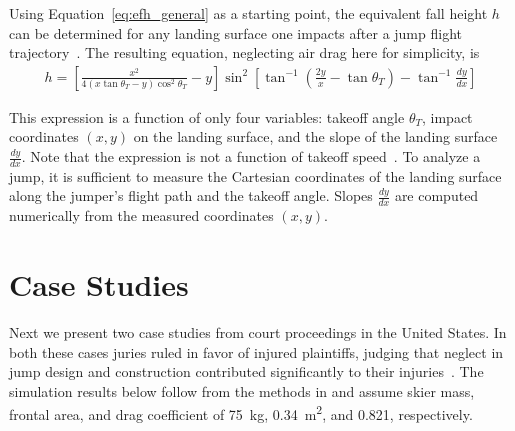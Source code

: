 \documentclass{article}
\begin{document}
Using Equation~\ref{eq:efh_general} as a starting point, the equivalent fall
height $h$ can be determined for any landing surface one impacts after a jump
flight trajectory~\cite{Petrone2017}. The resulting equation, neglecting air
drag here for simplicity, is
%
\begin{align}
  h = \left[\frac{x^2}{4(x\tan\theta_T - y)\cos^{2}\theta_T} -
    y\right]\sin^{2}\left[\tan^{-1}\left(\frac{2y}{x}- \tan\theta_T\right) -
    \tan^{-1}\frac{dy}{dx}\right]
  \label{eq:efh}
\end{align}

This expression is  a function of only four variables: takeoff angle
$\theta_T$, impact coordinates $(x,y)$ on the landing surface, and the slope of
the landing surface $\frac{dy}{dx}$. Note that the expression is not a function
of takeoff speed~\cite{Petrone2017}. To analyze a jump, it is sufficient to
measure the Cartesian coordinates of the landing surface along the jumper's
flight path and the takeoff angle. Slopes $\frac{dy}{dx}$ are computed
numerically from the measured coordinates $(x,y)$.

\section{Case Studies}
%
Next we present two case studies from court proceedings in the United States.
In both these cases juries ruled in favor of injured plaintiffs, judging that
neglect in jump design and construction contributed significantly to their
injuries~\cite{Alvarado2002,Salvini2008}. The simulation results below follow
from the methods in \cite{Levy2015} and assume skier mass, frontal area, and
drag coefficient of 75~\si{\kg}, 0.34~\si{\meter\squared}, and 0.821,
respectively.
\end{document}
